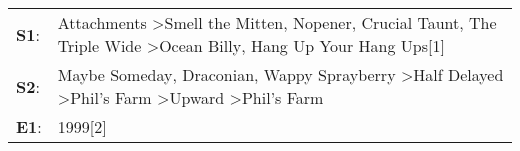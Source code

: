 \begin{supertabular}{p{0.03\textwidth}p{0.92\textwidth}}
 \textbf{S1}:  &       Attachments\textsuperscript{} \textgreater \enspace Smell the Mitten\textsuperscript{}, \enspace Nopener\textsuperscript{}, \enspace Crucial Taunt\textsuperscript{}, \enspace The Triple Wide\textsuperscript{} \textgreater \enspace Ocean Billy\textsuperscript{}, \enspace Hang Up Your Hang Ups[1]\textsuperscript{}  \enspace  \\
 \textbf{S2}:  &  Maybe Someday\textsuperscript{}, \enspace Draconian\textsuperscript{}, \enspace Wappy Sprayberry\textsuperscript{} \textgreater \enspace Half Delayed\textsuperscript{} \textgreater \enspace Phil's Farm\textsuperscript{} \textgreater \enspace Upward\textsuperscript{} \textgreater \enspace Phil's Farm\textsuperscript{}  \enspace  \\
 \textbf{E1}:  &                                                                                                                                                                                                                                                                                                       1999[2]\textsuperscript{}  \enspace  \\
\end{supertabular}
